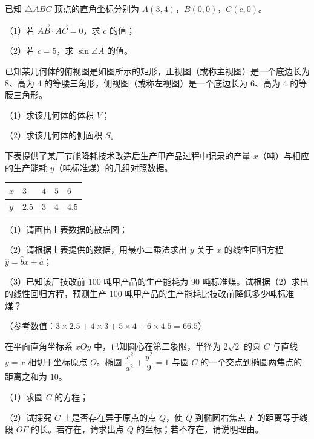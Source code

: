 \begin{question}
已知 $\triangle ABC$ 顶点的直角坐标分别为 $A(3,4)$，$B(0,0)$，$C(c,0)$。

（1）若 $\overrightarrow{AB}\cdot\overrightarrow{AC}=0$，求 $c$ 的值；

（2）若 $c=5$，求 $\sin\angle A$ 的值。

\Needspace{0.4\textheight}
\end{question}
\begin{question}
已知某几何体的俯视图是如图所示的矩形，正视图（或称主视图）是一个底边长为 $8$、高为 $4$ 的等腰三角形，侧视图（或称左视图）是一个底边长为 $6$、高为 $4$ 的等腰三角形。

（1）求该几何体的体积 $V$；

（2）求该几何体的侧面积 $S$。
\nopagebreak[4]
\begin{center}\end{center}
\nopagebreak[4]
\end{question}
\begin{question}
下表提供了某厂节能降耗技术改造后生产甲产品过程中记录的产量 $x$（吨）与相应的生产能耗 $y$（吨标准煤）的几组对照数据。

\begin{center}
\begin{tabular}{lllll}
\toprule
$x$ & $3$ & $4$ & $5$ & $6$ \\
\midrule
$y$ & $2.5$ & $3$ & $4$ & $4.5$ \\
\bottomrule
\end{tabular}
\end{center}

（1）请画出上表数据的散点图；

（2）请根据上表提供的数据，用最小二乘法求出 $y$ 关于 $x$ 的线性回归方程 $\hat y=\hat b x+\hat a$；

（3）已知该厂技改前 $100$ 吨甲产品的生产能耗为 $90$ 吨标准煤。试根据（2）求出的线性回归方程，预测生产 $100$ 吨甲产品的生产能耗比技改前降低多少吨标准煤？

（参考数值：$3\times2.5+4\times3+5\times4+6\times4.5=66.5$）

\end{question}
\begin{question}
在平面直角坐标系 $xOy$ 中，已知圆心在第二象限，半径为 $2\sqrt2$ 的圆 $C$ 与直线 $y=x$ 相切于坐标原点 $O$。椭圆 $\dfrac{x^2}{a^2}+\dfrac{y^2}{9}=1$ 与圆 $C$ 的一个交点到椭圆两焦点的距离之和为 $10$。

（1）求圆 $C$ 的方程；

（2）试探究 $C$ 上是否存在异于原点的点 $Q$，使 $Q$ 到椭圆右焦点 $F$ 的距离等于线段 $OF$ 的长。若存在，请求出点 $Q$ 的坐标；若不存在，请说明理由。

\end{question}
